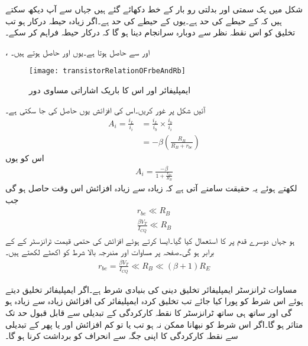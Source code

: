 شکل  میں یک سمتی اور بدلتی رو بار کے خط دکھائے گئے ہیں جہاں سے آپ دیکھ سکتے ہیں کہ   کے حیطے کی حد   ہے۔یوں  کے حیطے کی حد  ہے۔اگر زیادہ حیطہ درکار ہو تب تخلیق کو اس نقطہ نظر سے دوبارہ سرانجام دینا ہو گا کہ  درکار حیطہ فراہم کر سکے۔

،  اور  سے  حاصل ہوتا ہے۔یوں  اور  حاصل ہوتے ہیں۔
\begin{figure}
\centering
\texttt{[image: transistorRelationOFrbeAndRb]}
\caption{ایمپلیفائر اور اس کا باریک اشاراتی مساوی دور}
\label{شکل_ٹرانزسٹر_افزائش_بڑھانے_کی_شرط}
\end{figure}
آئیں شکل  پر غور کریں۔اس کی افزائش  یوں حاصل کی جا سکتی ہے۔
\begin{align*}
A_i=\frac{i_L}{i_i}&= \frac{i_L}{i_b} \times \frac{i_b}{i_i}\\
&=-\beta \left(\frac{R_B}{R_B+r_{be}} \right)
\end{align*}
اس کو یوں
\begin{align*}
A_i=\frac{-\beta}{1+\frac{r_{be}}{R_B}}
\end{align*}
لکھتے ہوئے یہ حقیقت سامنے آتی ہے کہ زیادہ سے زیادہ افزائش اس وقت حاصل ہو گی جب
\begin{align}
r_{be} \ll R_B\\
\frac{\beta V_T}{I_{CQ}} \ll R_B
\end{align}
ہو جہاں دوسرے قدم پر  کا استعمال کیا گیا۔ایسا کرتے ہوئے افزائش کی حتمی قیمت ٹرانزسٹر کے  کے برابر ہو گی۔صفحہ  پر مساوات  اور مندرجہ بالا شرط کو اکھٹے لکھتے ہیں۔
\begin{align}\label{مساوات_ٹرانزسٹر_ایمپلیفائر_تخلیق_کی_شرط}
r_{be} =\frac{\beta V_T}{I_{CQ}} \ll R_B \ll \left(\beta+1\right) R_E
\end{align}

مساوات  ٹرانزسٹر ایمپلیفائر تخلیق دینی کی بنیادی شرط ہے۔اگر ایمپلیفائر تخلیق دیتے ہوئے اس شرط کو پورا کیا جائے تب تخلیق کردہ ایمپلیفائر کی افزائش زیادہ سے زیادہ ہو گی اور ساتھ ہی ساتھ ٹرانزسٹر کا نقطہ کارکردگی  کے تبدیلی سے قابل قبول حد تک متاثر ہو گا۔اگر اس شرط کو نبھانا ممکن نہ ہو تب یا تو کم افزائش  اور یا پھر  کے تبدیلی سے نقطہ کارکردگی کا اپنی جگہ سے انحراف کو برداشت کرنا ہو گا۔



